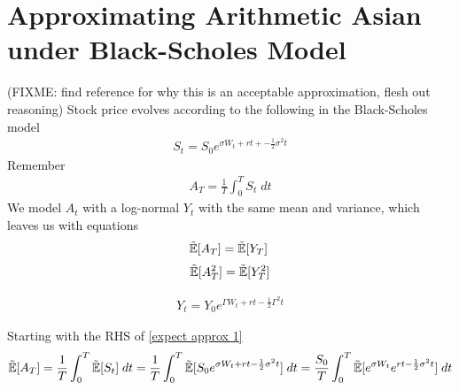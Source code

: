 \documentclass[reqno]{amsart}
\newcommand{\rE}[1]{\tilde{\E}[#1]}
\begin{document}
\section{Approximating Arithmetic Asian under Black-Scholes Model}
(FIXME: find reference for why this is an acceptable approximation, flesh out reasoning)
Stock price evolves according to the following in the Black-Scholes model
\begin{align} 
     S_t = S_0e^{\sigma W_t+rt+-\frac{1}{2}\sigma^2t}
\end{align}
Remember
\begin{align}
     A_T = \frac{1}{T}\int_0^T S_t \; dt
\end{align}
We model $A_t$ with a log-normal $Y_t$ with the same mean and variance, which leaves us with equations
\begin{align} \label{expect approx 1}
     \tilde{\mathbb{E}}[A_T] = \tilde{\mathbb{E}}[Y_T] \; 
\end{align}
\begin{align} \label{expect approx 2}
     \tilde{\mathbb{E}}[A_T^2] = \tilde{\mathbb{E}}[Y_T^2]
\end{align}

\begin{align} 
     Y_t = Y_0e^{\Gamma W_t+rt-\frac{1}{2}\Gamma^2t}
\end{align}

Starting with the RHS of \eqref{expect approx 1}
\begin{align} 
     \rE{A_T} 
     = \frac{1}{T} \int_0^T \tilde{\E}[S_t] \; dt 
     = \frac{1}{T} \int_0^T \tilde{\E}[S_0 e^{\sigma W_t+rt-\frac{1}{2}\sigma^2t}] \; dt
     = \frac{S_0}{T} \int_0^T\rE{e^{\sigma W_t}e^{rt-\frac{1}{2}\sigma^2t}} \; dt
\end{align}
\end{document}
